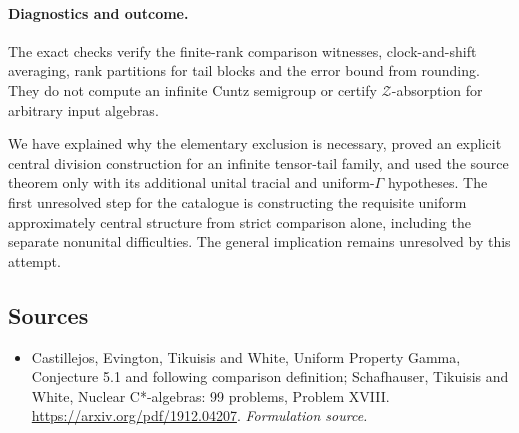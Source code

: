 \documentclass[11pt]{article}
\begin{document}
\paragraph{Diagnostics and outcome.}
The exact checks verify the finite-rank comparison witnesses,
clock-and-shift averaging, rank partitions for tail blocks and
the error bound from rounding. They do not compute an infinite
Cuntz semigroup or certify $\mathcal Z$-absorption for arbitrary
input algebras.

We have explained why the elementary exclusion is necessary,
proved an explicit central division construction for an infinite
tensor-tail family, and used the source theorem only with its
additional unital tracial and uniform-$\Gamma$ hypotheses.
The first unresolved step for the catalogue is constructing
the requisite uniform approximately central structure from
strict comparison alone, including the separate nonunital
difficulties. The general implication remains unresolved by
this attempt.
\subsection{Sources}
\begin{itemize}
\item[S1]Castillejos, Evington, Tikuisis and White, Uniform Property Gamma, Conjecture 5.1 and following comparison definition; Schafhauser, Tikuisis and White, Nuclear C*-algebras: 99 problems, Problem XVIII.
\url{https://arxiv.org/pdf/1912.04207}.
\textit{Formulation source.}
\end{itemize}
\end{document}
